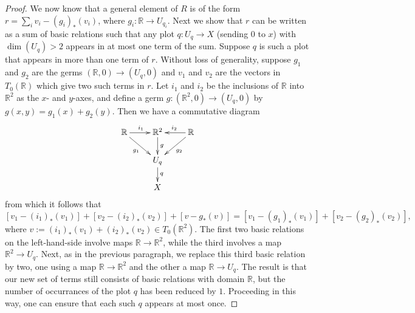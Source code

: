\documentclass[12pt]{amsart}
\theoremstyle{remark}
\def \R{\mathbb{R}}
\begin{document}
\begin{proof}
We now know that a general element of $R$ is of the form
$r = \sum_i v_i - (g_i)_*(v_i)$, where $g_i : \R \to U_{q_i}$.
Next we show that $r$ can be written as a sum of basic
relations such that any plot $q : U_q \to X$ (sending $0$ to $x$) with
$\dim(U_q) > 2$ appears in at most one term of the sum.
Suppose $q$ is such a plot that appears in more than one term of $r$.
Without loss of generality, suppose $g_1$ and $g_2$ are the germs $(\R,0) \to (U_q,0)$
and $v_1$ and $v_2$ are the vectors in $T_0(\R)$ which give two such terms in $r$.
Let $i_1$ and $i_2$ be the inclusions of $\R$ into $\R^2$ as the $x$- and $y$-axes,
and define a germ $g : (\R^2,0) \to (U_q,0)$ by $g(x,y) = g_1(x) + g_2(y)$.
%
Then we have a commutative diagram
\[
  \xymatrix@R-6pt{ \R \ar[r]^{i_1} \ar[dr]_{g_1} & \R^2 \ar[d]^-g & \R \ar[l]_{i_2} \ar[dl]^{g_2} \\
                                                 &  U_q \ar[d]^q \\
                                                 &  X }
\]
from which it follows that
\[
  [ v_1 - (i_1)_*(v_1) ] + [ v_2 - (i_2)_*(v_2) ] + [ v - g_*(v) ] = [ v_1 - (g_1)_*(v_1) ] + [ v_2 - (g_2)_*(v_2) ] ,
\]
where $v := (i_1)_*(v_1) + (i_2)_*(v_2) \in T_0(\R^2)$.
The first two basic relations on the left-hand-side involve maps $\R \to \R^2$,
while the third involves a map $\R^2 \to U_q$.
Next, as in the previous paragraph, we replace this third basic relation
by two, one using a map $\R \to \R^2$ and the other a map $\R \to U_q$.
The result is that our new set of terms still consists of basic relations
with domain $\R$, but the number of occurrances of the plot $q$ has
been reduced by $1$.
Proceeding in this way, one can ensure that each such $q$ appears at
most once.


\end{proof}
\end{document}
